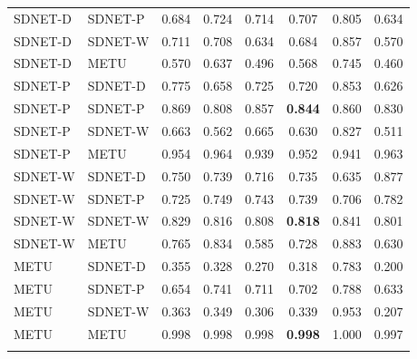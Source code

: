 \begin{table}[p]
\begin{tabular*}{\textwidth}{@{\extracolsep\fill}llcccccc@{}}
SDNET-D & SDNET-P & 0.684 & 0.724 & 0.714 & 0.707 & 0.805 & 0.634 \\
SDNET-D & SDNET-W & 0.711 & 0.708 & 0.634 & 0.684 & 0.857 & 0.570 \\
SDNET-D & METU & 0.570 & 0.637 & 0.496 & 0.568 & 0.745 & 0.460 \\
SDNET-P & SDNET-D & 0.775 & 0.658 & 0.725 & 0.720 & 0.853 & 0.626 \\
SDNET-P & SDNET-P & 0.869 & 0.808 & 0.857 & \textbf{0.844} & 0.860 & 0.830 \\
SDNET-P & SDNET-W & 0.663 & 0.562 & 0.665 & 0.630 & 0.827 & 0.511 \\
SDNET-P & METU & 0.954 & 0.964 & 0.939 & 0.952 & 0.941 & 0.963 \\
SDNET-W & SDNET-D & 0.750 & 0.739 & 0.716 & 0.735 & 0.635 & 0.877 \\
SDNET-W & SDNET-P & 0.725 & 0.749 & 0.743 & 0.739 & 0.706 & 0.782 \\
SDNET-W & SDNET-W & 0.829 & 0.816 & 0.808 & \textbf{0.818} & 0.841 & 0.801 \\
SDNET-W & METU & 0.765 & 0.834 & 0.585 & 0.728 & 0.883 & 0.630 \\
METU & SDNET-D & 0.355 & 0.328 & 0.270 & 0.318 & 0.783 & 0.200 \\
METU & SDNET-P & 0.654 & 0.741 & 0.711 & 0.702 & 0.788 & 0.633 \\
METU & SDNET-W & 0.363 & 0.349 & 0.306 & 0.339 & 0.953 & 0.207 \\
METU & METU & 0.998 & 0.998 & 0.998 & \textbf{0.998} & 1.000 & 0.997 \\
\botrule
\end{tabular*}
\end{table}


